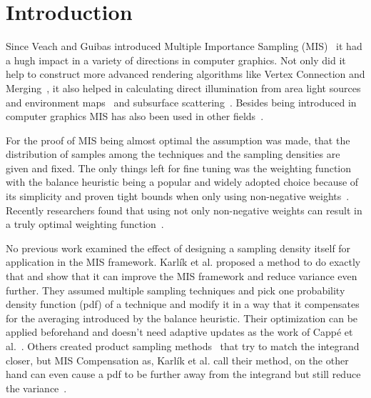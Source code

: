 \chapter{Introduction}
\label{ch:introduction}
Since Veach and Guibas introduced Multiple Importance Sampling (MIS)~\cite{veach_guibas}
it had a hugh impact in a variety of directions in computer graphics.
Not only did it help to construct more advanced rendering algorithms like Vertex Connection and Merging~\cite{vcm},
it also helped in calculating direct illumination from area light sources and environment maps~\cite[Chapter~14.3]{pbr-book}
and subsurface scattering~\cite{King}.
Besides being introduced in computer graphics MIS has also been used in other fields~\cite{he}.

For the proof of MIS being almost optimal the assumption was made,
that the distribution of samples among the techniques and the sampling densities are given and fixed.
The only things left for fine tuning was the weighting function
with the balance heuristic being a popular and widely adopted choice because of its simplicity
and proven tight bounds when only using non-negative weights~\cite[Theorem~9.2]{veach-thesis}.
Recently researchers found that using not only non-negative weights can result in a truly optimal weighting function~\cite{Kondapaneni2019}.

No previous work examined the effect of designing a sampling density itself for application in the MIS framework.
Karl\'ik et al. proposed a method to do exactly that and show that it can improve the MIS framework and reduce variance even further.
They assumed multiple sampling techniques and pick one probability density function (pdf) of a technique and modify it in a way that it compensates for the averaging introduced by the balance heuristic.
Their optimization can be applied beforehand and doesn't need adaptive updates as the work of Capp\'e et al.~\cite{Cappe2008}.
Others created product sampling methods~\cite{Herholz} that try to match the integrand closer,
but MIS Compensation as, Karl\'ik et al. call their method,
on the other hand can even cause a pdf to be further away from the integrand but still reduce the variance~\cite{Karlik2019}.




